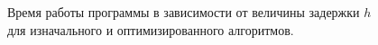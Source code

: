 \begin{figure}[bh]
        \noindent{}
        \caption{Время работы программы в зависимости от величины задержки $h$ для изначального и оптимизированного алгоритмов.}
        \label{img:cpu}
\end{figure}